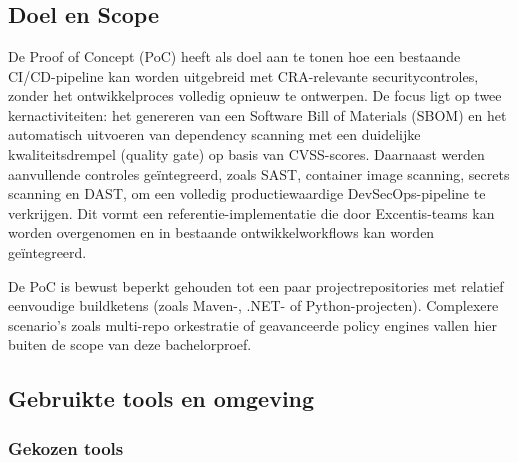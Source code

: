 
\chapter{}%
\label{ch:Proof of Concept}
\section{Doel en Scope}
De Proof of Concept (PoC) heeft als doel aan te tonen hoe een bestaande CI/CD-pipeline kan worden uitgebreid met CRA-relevante securitycontroles, zonder het ontwikkelproces volledig opnieuw te ontwerpen. De focus ligt op twee kernactiviteiten: het genereren van een Software Bill of Materials (SBOM) en het automatisch uitvoeren van dependency scanning met een duidelijke kwaliteitsdrempel (quality gate) op basis van CVSS-scores. Daarnaast werden aanvullende controles geïntegreerd, zoals SAST, container image scanning, secrets scanning en DAST, om een volledig productiewaardige DevSecOps-pipeline te verkrijgen. Dit vormt een referentie-implementatie die door Excentis-teams kan worden overgenomen en in bestaande ontwikkelworkflows kan worden geïntegreerd.

De PoC is bewust beperkt gehouden tot een paar projectrepositories met relatief eenvoudige buildketens (zoals Maven-, .NET- of Python-projecten). Complexere scenario's zoals multi-repo orkestratie of geavanceerde policy engines vallen hier buiten de scope van deze bachelorproef.

\section{Gebruikte tools en omgeving}

\subsection{Gekozen tools}

